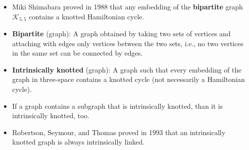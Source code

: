 \documentclass[titlepage]{article}
\numberwithin{figure}{section}
\numberwithin{table}{section}
\numberwithin{equation}{section}
\begin{document}
\begin{itemize}
    \item Miki Shimabara proved in 1988 that any embedding of the \textbf{bipartite} graph $\mathcal{K}_{5,5}$ contains a knotted Hamiltonian cycle.
    \item \textbf{Bipartite} (graph): A graph obtained by taking two sets of vertices and attaching with edges only vertices between the two sets, i.e., no two vertices in the same set can be connected by edges.
    \item \textbf{Intrinsically knotted} (graph): A graph such that every embedding of the graph in three-space contains a knotted cycle (not necessarily a Hamiltonian cycle).
    \item If a graph contains a subgraph that is intrinsically knotted, than it is intrinsically knotted, too.
    \item Robertson, Seymour, and Thomas proved in 1993 that an intrinsically knotted graph is always intrinsically linked.
\end{itemize}
\end{document}
